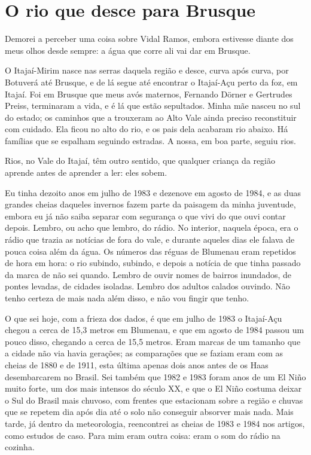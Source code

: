 \documentclass[
  brazilian,
  11pt,
  openany]{book}
\begin{document}
\section{O rio que desce para
Brusque}\label{o-rio-que-desce-para-brusque}

Demorei a perceber uma coisa sobre Vidal Ramos, embora estivesse diante
dos meus olhos desde sempre: a água que corre ali vai dar em Brusque.

O Itajaí-Mirim nasce nas serras daquela região e desce, curva após
curva, por Botuverá até Brusque, e de lá segue até encontrar o
Itajaí-Açu perto da foz, em Itajaí. Foi em Brusque que meus avós
maternos, Fernando Dörner e Gertrudes Preiss, terminaram a vida, e é lá
que estão sepultados. Minha mãe nasceu no sul do estado; os caminhos que
a trouxeram ao Alto Vale ainda preciso reconstituir com cuidado. Ela
ficou no alto do rio, e os pais dela acabaram rio abaixo. Há famílias
que se espalham seguindo estradas. A nossa, em boa parte, seguiu rios.

Rios, no Vale do Itajaí, têm outro sentido, que qualquer criança da
região aprende antes de aprender a ler: eles sobem.

Eu tinha dezoito anos em julho de 1983 e dezenove em agosto de 1984, e
as duas grandes cheias daqueles invernos fazem parte da paisagem da
minha juventude, embora eu já não saiba separar com segurança o que vivi
do que ouvi contar depois. Lembro, ou acho que lembro, do rádio. No
interior, naquela época, era o rádio que trazia as notícias de fora do
vale, e durante aqueles dias ele falava de pouca coisa além da água. Os
números das réguas de Blumenau eram repetidos de hora em hora: o rio
subindo, subindo, e depois a notícia de que tinha passado da marca de
não sei quando. Lembro de ouvir nomes de bairros inundados, de pontes
levadas, de cidades isoladas. Lembro dos adultos calados ouvindo. Não
tenho certeza de mais nada além disso, e não vou fingir que tenho.

O que sei hoje, com a frieza dos dados, é que em julho de 1983 o
Itajaí-Açu chegou a cerca de 15,3 metros em Blumenau, e que em agosto de
1984 passou um pouco disso, chegando a cerca de 15,5 metros. Eram marcas
de um tamanho que a cidade não via havia gerações; as comparações que se
faziam eram com as cheias de 1880 e de 1911, esta última apenas dois
anos antes de os Haas desembarcarem no Brasil. Sei também que 1982 e
1983 foram anos de um El Niño muito forte, um dos mais intensos do
século XX, e que o El Niño costuma deixar o Sul do Brasil mais chuvoso,
com frentes que estacionam sobre a região e chuvas que se repetem dia
após dia até o solo não conseguir absorver mais nada. Mais tarde, já
dentro da meteorologia, reencontrei as cheias de 1983 e 1984 nos
artigos, como estudos de caso. Para mim eram outra coisa: eram o som do
rádio na cozinha.
\end{document}
